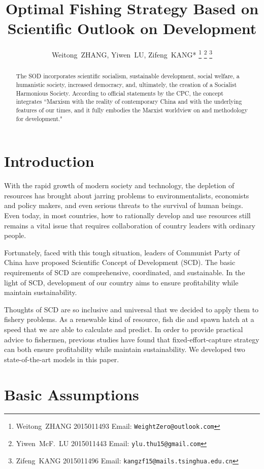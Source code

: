 \documentclass{IEEEtran}
\title{Optimal Fishing Strategy Based on Scientific Outlook on Development}
\author{
    Weitong~ZHANG, Yiwen~LU, Zifeng~KANG*
    \thanks{Weitong~ZHANG 2015011493 Email: \texttt{WeightZero@outlook.com}}
    \thanks{Yiwen~McF.~LU 2015011443 Email: \texttt{ylu.thu15@gmail.com}}
    \thanks{Zifeng~KANG 2015011496 Email: \texttt{kangzf15@mails.tsinghua.edu.cn}}
}
\begin{document}
\maketitle

\begin{abstract}
    The SOD incorporates scientific socialism, sustainable development, social welfare, a humanistic society, increased democracy, and, ultimately, the creation of a Socialist Harmonious Society. According to official statements by the CPC, the concept integrates ``Marxism with the reality of contemporary China and with the underlying features of our times, and it fully embodies the Marxist worldview on and methodology for development."
\end{abstract}

\section{Introduction}

With the rapid growth of modern society and technology, the depletion of resources has brought about jarring problems to environmentalists, economists and policy makers, and even serious threats to the survival of human beings. Even today, in most countries, how to rationally develop and use resources still remains a vital issue that requires collaboration of country leaders with ordinary people.

Fortunately, faced with this tough situation, leaders of Communist Party of China have proposed Scientific Concept of Development (SCD). The basic requirements of SCD are comprehensive, coordinated, and sustainable. In the light of SCD, development of our country aims to ensure profitability while maintain sustainability.

Thoughts of SCD are so inclusive and universal that we decided to apply them to fishery problems. As a renewable kind of resource, fish die and spawn hatch at a speed that we are able to calculate and predict. In order to provide practical advice to fishermen, previous studies have found that fixed-effort-capture strategy can both ensure profitability while maintain sustainability. We developed two state-of-the-art models in this paper.

\section{Basic Assumptions}
\end{document}
